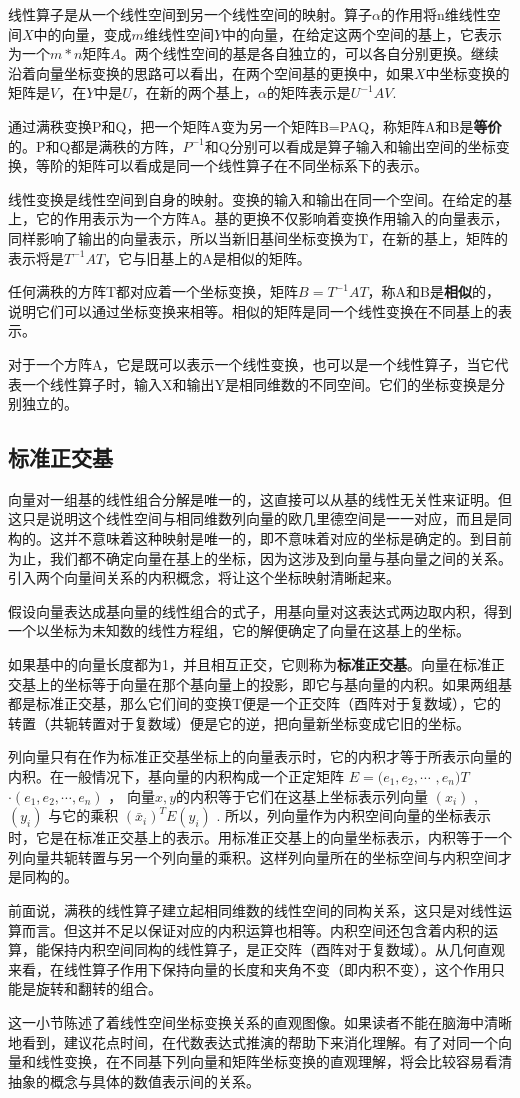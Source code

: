 线性算子是从一个线性空间到另一个线性空间的映射。算子$ \alpha $的作用将$  $n维线性空间$ X $中的向量，变成$ m $维线性空间$ Y $中的向量，在给定这两个空间的基上，它表示为一个$ m*n $矩阵$ A $。两个线性空间的基是各自独立的，可以各自分别更换。继续沿着向量坐标变换的思路可以看出，在两个空间基的更换中，如果$ X $中坐标变换的矩阵是$ V $，在$ Y $中是$ U $，在新的两个基上，$ \alpha $的矩阵表示是$ U^{-1}AV $.

通过满秩变换P和Q，把一个矩阵A变为另一个矩阵B=PAQ，称矩阵A和B是\textbf{等价}的。P和Q都是满秩的方阵，$ P^{-1} $和Q分别可以看成是算子输入和输出空间的坐标变换，等阶的矩阵可以看成是同一个线性算子在不同坐标系下的表示。

线性变换是线性空间到自身的映射。变换的输入和输出在同一个空间。在给定的基上，它的作用表示为一个方阵A。基的更换不仅影响着变换作用输入的向量表示，同样影响了输出的向量表示，所以当新旧基间坐标变换为T，在新的基上，矩阵的表示将是$ T^{-1}AT $，它与旧基上的A是相似的矩阵。

任何满秩的方阵T都对应着一个坐标变换，矩阵$ B=T^{-1}AT $，称A和B是\textbf{相似}的，说明它们可以通过坐标变换来相等。相似的矩阵是同一个线性变换在不同基上的表示。

对于一个方阵A，它是既可以表示一个线性变换，也可以是一个线性算子，当它代表一个线性算子时，输入X和输出Y是相同维数的不同空间。它们的坐标变换是分别独立的。

\subsection{标准正交基}

向量对一组基的线性组合分解是唯一的，这直接可以从基的线性无关性来证明。但这只是说明这个线性空间与相同维数列向量的欧几里德空间是一一对应，而且是同构的。这并不意味着这种映射是唯一的，即不意味着对应的坐标是确定的。到目前为止，我们都不确定向量在基上的坐标，因为这涉及到向量与基向量之间的关系。引入两个向量间关系的内积概念，将让这个坐标映射清晰起来。

假设向量表达成基向量的线性组合的式子，用基向量对这表达式两边取内积，得到一个以坐标为未知数的线性方程组，它的解便确定了向量在这基上的坐标。

如果基中的向量长度都为1，并且相互正交，它则称为\textbf{标准正交基}。向量在标准正交基上的坐标等于向量在那个基向量上的投影，即它与基向量的内积。如果两组基都是标准正交基，那么它们间的变换T便是一个正交阵（酉阵对于复数域），它的转置（共轭转置对于复数域）便是它的逆，把向量新坐标变成它旧的坐标。

列向量只有在作为标准正交基坐标上的向量表示时，它的内积才等于所表示向量的内积。在一般情况下，基向量的内积构成一个正定矩阵 $ E = ( e_1, e_2, \cdots$  $, e_n )$$  T $ $ \cdot(e_1,e_2,\cdots,e_n) $ ，
向量$ x, y $的内积等于它们在这基上坐标表示列向量 $ (x_i)$ ,  $(y_i) $ 与它的乘积 $(\bar{x}_i)^TE(y_i) $ . 所以，列向量作为内积空间向量的坐标表示时，它是在标准正交基上的表示。用标准正交基上的向量坐标表示，内积等于一个列向量共轭转置与另一个列向量的乘积。这样列向量所在的坐标空间与内积空间才是同构的。

前面说，满秩的线性算子建立起相同维数的线性空间的同构关系，这只是对线性运算而言。但这并不足以保证对应的内积运算也相等。内积空间还包含着内积的运算，能保持内积空间同构的线性算子，是正交阵（酉阵对于复数域）。从几何直观来看，在线性算子作用下保持向量的长度和夹角不变（即内积不变），这个作用只能是旋转和翻转的组合。

这一小节陈述了着线性空间坐标变换关系的直观图像。如果读者不能在脑海中清晰地看到，建议花点时间，在代数表达式推演的帮助下来消化理解。有了对同一个向量和线性变换，在不同基下列向量和矩阵坐标变换的直观理解，将会比较容易看清抽象的概念与具体的数值表示间的关系。